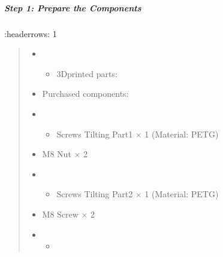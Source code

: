 \documentclass[letterpaper,10pt,english]{sphinxmanual}
\begin{document}
\subparagraph{Step 1: Prepare the Components}
\label{\detokenize{4-Assembly-Instructions-Screws-and-Nuts:id3}}
\sphinxAtStartPar
    :header\sphinxhyphen{}rows: 1
\begin{quote}
\begin{itemize}
\item {} \begin{itemize}
\item {} 
\sphinxAtStartPar
3D\sphinxhyphen{}printed parts:

\end{itemize}

\end{itemize}
\begin{itemize}
\item {} 
\sphinxAtStartPar
Purchased components:

\end{itemize}
\begin{itemize}
\item {} \begin{itemize}
\item {} 
\sphinxAtStartPar
Screws Tilting Part1 × 1 (Material: PETG)

\end{itemize}

\end{itemize}
\begin{itemize}
\item {} 
\sphinxAtStartPar
M8 Nut × 2

\end{itemize}
\begin{itemize}
\item {} \begin{itemize}
\item {} 
\sphinxAtStartPar
Screws Tilting Part2 × 1 (Material: PETG)

\end{itemize}

\end{itemize}
\begin{itemize}
\item {} 
\sphinxAtStartPar
30mm M8 Screw × 2

\end{itemize}
\begin{itemize}
\item {} \begin{itemize}
\item {} 
\end{itemize}


\end{itemize}
\end{quote}
\end{document}
